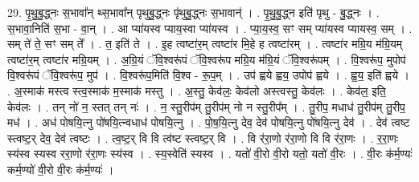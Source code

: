 \documentclass[17pt]{extarticle}
\begin{document}
29. पृ॒थु॒बु॒द्ध्नः स॒भावा᳚न् थ्स॒भावा᳚न् पृथुबु॒द्ध्नः पृ॑थुबु॒द्ध्नः स॒भावान्॑ । . पृ॒थु॒बु॒द्ध्न इति॑ पृथु - बु॒द्ध्नः । . स॒भावा॒निति॑ स॒भा - वा॒न् । . आ प्या॑यस्व प्याय॒स्वा प्या॑यस्व । . प्या॒य॒स्व॒ सꣳ सम् प्या॑यस्व प्यायस्व॒ सम् । . सम् ते॑ ते॒ सꣳ सम् ते᳚ । . त॒ इति॑ ते । . इ॒ह त्वष्टा॑र॒म् त्वष्टा॑र मि॒हे ह त्वष्टा॑रम् । . त्वष्टा॑र मग्रि॒य म॑ग्रि॒यम् त्वष्टा॑र॒म् त्वष्टा॑र मग्रि॒यम् । . अ॒ग्रि॒यं ॅवि॒श्वरू॑पं ॅवि॒श्वरू॑प मग्रि॒य म॑ग्रि॒यं ॅवि॒श्वरू॑पम् । . वि॒श्वरू॑प॒ मुपोप॑ वि॒श्वरू॑पं ॅवि॒श्वरू॑प॒ मुप॑ । . वि॒श्वरू॑प॒मिति॑ वि॒श्व - रू॒प॒म् । . उप॑ ह्वये ह्वय॒ उपोप॑ ह्वये । . ह्व॒य॒ इति॑ ह्वये । . अ॒स्माक॑ मस्त्व स्त्व॒स्माक॑ म॒स्माक॑ मस्तु । . अ॒स्तु॒ केव॑लः॒ केव॑लो अस्त्वस्तु॒ केव॑लः । . केव॑ल॒ इति॒ केव॑लः । . तन् नो॑ न॒ स्तत् तन् नः॑ । . न॒ स्तु॒रीप॑म् तु॒रीप॑म् नो न स्तु॒रीप᳚म् । . तु॒रीप॒ मधाध॑ तु॒रीप॑म् तु॒रीप॒ मध॑ । . अध॑ पोषयि॒त्नु पो॑षयि॒त्न्वधाध॑ पोषयि॒त्नु । . पो॒ष॒यि॒त्नु देव॒ देव॑ पोषयि॒त्नु पो॑षयि॒त्नु देव॑ । . देव॑ त्वष्ट स्त्वष्ट॒र् देव॒ देव॑ त्वष्टः । . त्व॒ष्ट॒र् वि वि त्व॑ष्ट स्त्वष्ट॒र् वि । . वि र॑रा॒णो र॑रा॒णो वि वि र॑रा॒णः । . र॒रा॒णः स्य॑स्व स्यस्व ररा॒णो र॑रा॒णः स्य॑स्व । . स्य॒स्वेति॑ स्यस्व । . यतो॑ वी॒रो वी॒रो यतो॒ यतो॑ वी॒रः । . वी॒रः क॑र्म॒ण्यः॑ कर्म॒ण्यो॑ वी॒रो वी॒रः क॑र्म॒ण्यः॑ । \newline
\end{document}
